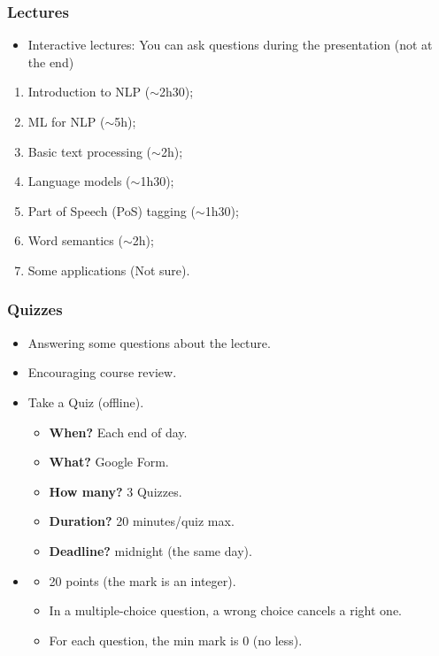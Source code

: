 \documentclass{beamer}
\begin{document}
\begin{frame}
\frametitle{Lectures}

\begin{itemize}
	\item Interactive lectures: You can ask questions during the presentation (not at the end)
\end{itemize}

\begin{enumerate}
	\item Introduction to NLP ($\sim$2h30);
	\item ML for NLP ($\sim$5h);
	\item Basic text processing ($\sim$2h);
	\item Language models ($\sim$1h30);
	\item Part of Speech (PoS) tagging ($\sim$1h30);
	\item Word semantics ($\sim$2h);
	\item Some applications (Not sure).
\end{enumerate}

\end{frame}

\begin{frame}
	\frametitle{Quizzes}
	
	\begin{itemize}
		\item Answering some questions about the lecture.
		\item {} Encouraging course review.
		\item {} Take a Quiz (offline).
		\begin{itemize}
			\item \textbf{When?} Each end of day.
			\item \textbf{What?} Google Form.
			\item \textbf{How many?} 3 Quizzes.
			\item \textbf{Duration?} 20 minutes/quiz max.
			\item \textbf{Deadline?} midnight (the same day).
		\end{itemize}
		\item {}
		\begin{itemize}
			\item 20 points (the mark is an integer).
			\item In a multiple-choice question, a wrong choice cancels a right one.
			\item For each question, the min mark is 0 (no less).
		\end{itemize}
	\end{itemize}
	
\end{frame}
\end{document}
